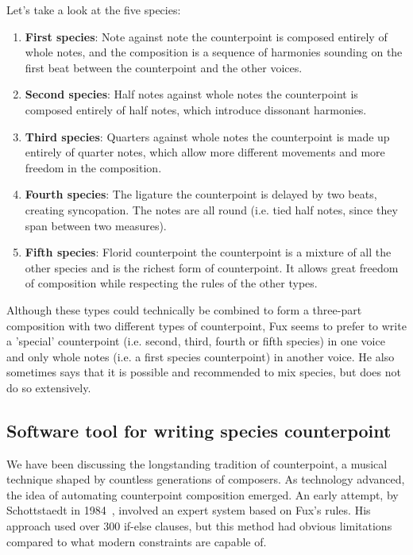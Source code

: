 Let's take a look at the five species:
\begin{enumerate}
    \item \textbf{First species}: Note against note \textendash{} the counterpoint is composed entirely of whole notes, and the composition is a sequence of harmonies sounding on the first beat between the counterpoint and the other voices.
    \item \textbf{Second species}: Half notes against whole notes \textendash{} the counterpoint is composed entirely of half notes, which introduce dissonant harmonies.
    \item \textbf{Third species}: Quarters against whole notes \textendash{} the counterpoint is made up entirely of quarter notes, which allow more different movements and more freedom in the composition.
    \item \textbf{Fourth species}: The ligature \textendash{} the counterpoint is delayed by two beats, creating syncopation. The notes are all round (i.e. tied half notes, since they span between two measures).
    \item \textbf{Fifth species}: Florid counterpoint \textendash{} the counterpoint is a mixture of all the other species and is the richest form of counterpoint. It allows great freedom of composition while respecting the rules of the other types.
\end{enumerate}

Although these types could technically be combined to form a three-part composition with two different types of counterpoint, Fux seems to prefer to write a 'special' counterpoint (i.e. second, third, fourth or fifth species) in one voice and only whole notes (i.e. a first species counterpoint) in another voice. He also sometimes says that it is possible and recommended to mix species, but does not do so extensively.

\subsection{Software tool for writing species counterpoint}
We have been discussing the longstanding tradition of counterpoint, a musical technique shaped by countless generations of composers. As technology advanced, the idea of automating counterpoint composition emerged. An early attempt, by Schottstaedt in 1984~\cite{bill1984}, involved an expert system based on Fux's rules. His approach used over 300 if-else clauses, but this method had obvious limitations compared to what modern constraints are capable of.

